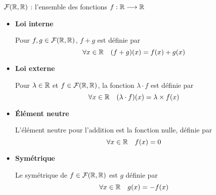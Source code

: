 \begin{frame}
\centerline{}

\medskip

$\mathcal{F}(\mathbb{R}, \mathbb{R})$ : l'ensemble des fonctions $f : \mathbb{R} \longrightarrow \mathbb{R}$
    
\pause 

\begin{itemize}
  \item \textbf{Loi interne} 
  
Pour $f, g \in \mathcal{F}(\mathbb{R}, \mathbb{R})$, $f+g$ est définie par
$$\forall x \in \mathbb{R} \quad (f+g)(x)=f(x)+g(x)$$
    
\pause   
  \item \textbf{Loi externe} 
  
Pour $\lambda \in \mathbb{R}$ et $f \in \mathcal{F}(\mathbb{R}, \mathbb{R})$, la fonction 
$\lambda \cdot f$ est définie par
$$\forall x \in \mathbb{R} \quad (\lambda \cdot f) (x)=\lambda \times f (x)$$
 
    
\pause   
  \item \textbf{\'Elément neutre} 
  
  L'élément neutre pour l'addition est la fonction nulle, définie par
$$\forall x \in \mathbb{R} \quad f(x)=0$$
     
\pause  
  \item \textbf{Symétrique}  
  
Le symétrique de $f \in \mathcal{F}(\mathbb{R} , \mathbb{R})$ est $g$ définie par
$$\forall x \in \mathbb{R} \quad g(x)=-f(x)$$
   
\end{itemize}
\end{frame}



